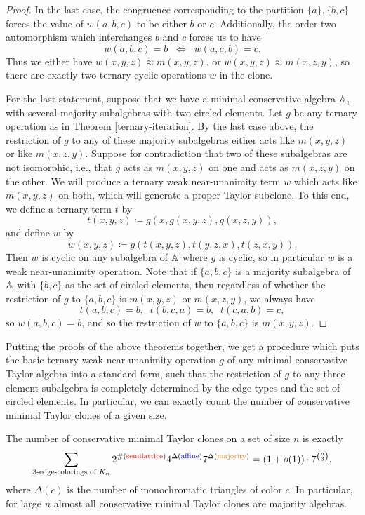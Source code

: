 \documentclass[letterpaper,11pt]{article}
\begin{document}
\begin{proof}
In the last case, the congruence corresponding to the partition $\{a\},\{b,c\}$ forces the value of $w(a,b,c)$ to be either $b$ or $c$. Additionally, the order two automorphism which interchanges $b$ and $c$ forces us to have
\[
w(a,b,c) = b \;\; \iff \;\; w(a,c,b) = c.
\]
Thus we either have $w(x,y,z) \approx m(x,y,z)$, or $w(x,y,z) \approx m(x,z,y)$, so there are exactly two ternary cyclic operations $w$ in the clone.

For the last statement, suppose that we have a minimal conservative algebra $\mathbb{A}$, with several majority subalgebras with two circled elements. Let $g$ be any ternary operation as in Theorem \ref{ternary-iteration}. By the last case above, the restriction of $g$ to any of these majority subalgebras either acts like $m(x,y,z)$ or like $m(x,z,y)$. Suppose for contradiction that two of these subalgebras are not isomorphic, i.e., that $g$ acts as $m(x,y,z)$ on one and acts as $m(x,z,y)$ on the other. We will produce a ternary weak near-unanimity term $w$ which acts like $m(x,y,z)$ on both, which will generate a proper Taylor subclone. To this end, we define a ternary term $t$ by
\[
t(x,y,z) \coloneqq g(x,g(x,y,z),g(x,z,y)),
\]
and define $w$ by
\[
w(x,y,z) \coloneqq g(t(x,y,z),t(y,z,x),t(z,x,y)).
\]
Then $w$ is cyclic on any subalgebra of $\mathbb{A}$ where $g$ is cyclic, so in particular $w$ is a weak near-unanimity operation. Note that if $\{a,b,c\}$ is a majority subalgebra of $\mathbb{A}$ with $\{b,c\}$ as the set of circled elements, then regardless of whether the restriction of $g$ to $\{a,b,c\}$ is $m(x,y,z)$ or $m(x,z,y)$, we always have
\[
t(a,b,c) = b, \;\; t(b,c,a) = b, \;\; t(c,a,b) = c,
\]
so $w(a,b,c) = b$, and so the restriction of $w$ to $\{a,b,c\}$ is $m(x,y,z)$.
\end{proof}

Putting the proofs of the above theorems together, we get a procedure which puts the basic ternary weak near-unanimity operation $g$ of any minimal conservative Taylor algebra into a standard form, such that the restriction of $g$ to any three element subalgebra is completely determined by the edge types and the set of circled elements. In particular, we can exactly count the number of conservative minimal Taylor clones of a given size.

\begin{cor} The number of conservative minimal Taylor clones on a set of size $n$ is exactly
\[
\sum_{3\text{-edge-colorings of }K_n} 2^{\#(\text{\textcolor{red}{semilattice}})}4^{\Delta(\text{\textcolor{blue}{affine}})}7^{\Delta(\text{\textcolor{orange}{majority}})} = (1+o(1))\cdot 7^{\binom{n}{3}},
\]
where $\Delta(c)$ is the number of monochromatic triangles of color $c$. In particular, for large $n$ almost all conservative minimal Taylor clones are majority algebras.
\end{cor}
\end{document}
